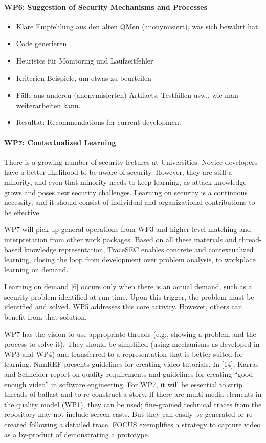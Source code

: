\paragraph*{WP6: Suggestion of Security Mechanisms and Processes}
\begin{itemize}
\item Klare Empfehlung aus den alten QMen (anonymisiert), was sich bewährt hat
\item Code generieren
\item Heuristcs für Monitoring und Laufzeitfehler
\item Kriterien-Beispiele, um etwas zu beurteilen
\item Fälle aus anderen (anonymisierten) Artifacts, Testfällen usw., wie man weiterarbeiten kann.
\item Resultat:  Recommendations for current development
\end{itemize}

\paragraph*{WP7: Contextualized Learning}
There is a growing number of security lectures at Universities. Novice developers have a better likelihood to be aware of security. However, they are still a minority, and even that minority needs to keep learning, as attack knowledge grows and poses new security challenges. Learning on security is a continuous necessity, and it should consist of individual and organizational contributions to be effective.

WP7 will pick up general operations from WP3 and higher-level matching and interpretation from other work packages. Based on all these materials and thread-based knowledge representation, TraceSEC enables concrete and contextualized learning, closing the loop from development over problem analysis, to workplace learning on demand.

Learning on demand [6] occurs only when there is an actual demand, such as a security problem identified at run-time. Upon this trigger, the problem must be identified and solved. WP5 addresses this core activity. However, others can benefit from that solution.

WP7 has the vision to use appropriate threads (e.g., showing a problem and the process to solve it). They should be simplified (using mechanisms as developed in WP3 and WP4) and transferred to a representation that is better suited for learning. NnnREF presents guidelines for creating video tutorials. In [14], Karras and Schneider report on quality requirements and guidelines for creating “good-enough video” in software engineering. For WP7, it will be essential to strip threads of ballast and to re-construct a story. If there are multi-media elements in the quality model (WP1), they can be used; fine-grained technical traces from the repository may not include screen casts. But they can easily be generated or re-created following a detailed trace. FOCUS exemplifies a strategy to capture video as a by-product of demonstrating a prototype. 

